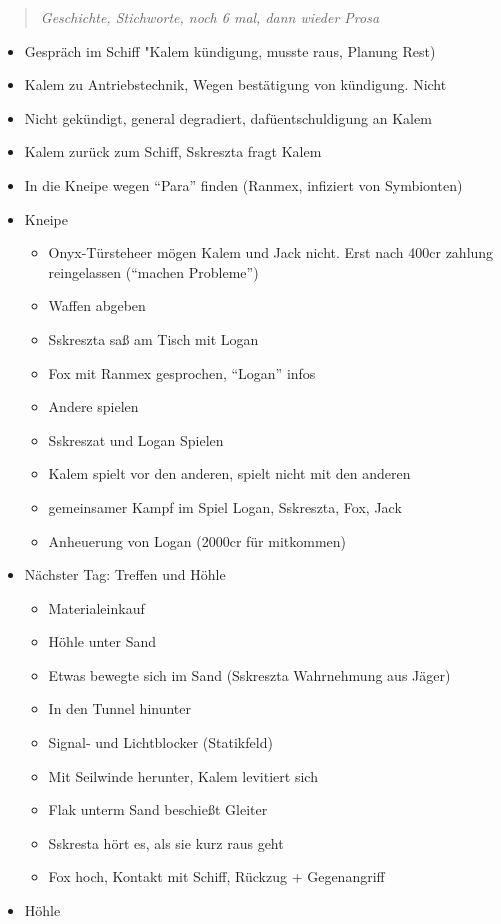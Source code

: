 \documentclass[11pt]{article}
\begin{document}
\begin{quote}
\emph{Geschichte, Stichworte, noch 6 mal, dann wieder Prosa}

\end{quote}
\begin{itemize}
\item
  Gespräch im Schiff "Kalem kündigung, musste raus, Planung Rest)
\item
  Kalem zu Antriebstechnik, Wegen bestätigung von kündigung. Nicht
\item
  Nicht gekündigt, general degradiert, dafüentschuldigung an Kalem
\item
  Kalem zurück zum Schiff, Sskreszta fragt Kalem
\item
  In die Kneipe wegen ``Para'' finden (Ranmex, infiziert von Symbionten)
\item
  Kneipe

  \begin{itemize}
  \item
    Onyx-Türsteheer mögen Kalem und Jack nicht. Erst nach 400cr zahlung
    reingelassen (``machen Probleme'')
  \item
    Waffen abgeben
  \item
    Sskreszta saß am Tisch mit Logan
  \item
    Fox mit Ranmex gesprochen, ``Logan'' infos
  \item
    Andere spielen
  \item
    Sskreszat und Logan Spielen
  \item
    Kalem spielt vor den anderen, spielt nicht mit den anderen
  \item
    gemeinsamer Kampf im Spiel Logan, Sskreszta, Fox, Jack
  \item
    Anheuerung von Logan (2000cr für mitkommen)
  \end{itemize}
\item
  Nächster Tag: Treffen und Höhle

  \begin{itemize}
  \item
    Materialeinkauf
  \item
    Höhle unter Sand
  \item
    Etwas bewegte sich im Sand (Sskreszta Wahrnehmung aus Jäger)
  \item
    In den Tunnel hinunter
  \item
    Signal- und Lichtblocker (Statikfeld)
  \item
    Mit Seilwinde herunter, Kalem levitiert sich
  \item
    Flak unterm Sand beschießt Gleiter
  \item
    Sskresta hört es, als sie kurz raus geht
  \item
    Fox hoch, Kontakt mit Schiff, Rückzug + Gegenangriff
  \end{itemize}
\item
  Höhle


\end{itemize}
\end{document}

